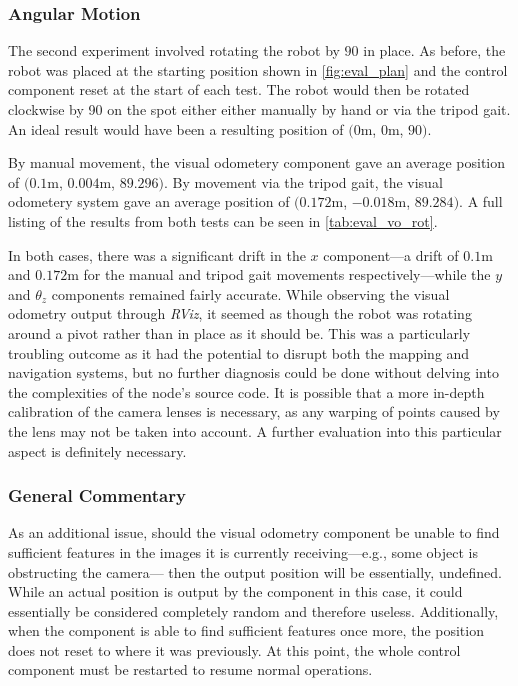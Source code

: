 \subsubsection{Angular Motion}

The second experiment involved rotating the robot by $90$\textdegree{} in place. As before, the robot was placed at the starting position shown in \autoref{fig:eval_plan} and the control component reset at the start of each test. The robot would then be rotated clockwise by 90\textdegree{} on the spot either either manually by hand or via the tripod gait. An ideal result would have been a resulting position of $(0$m, $0$m, $90$\textdegree{}$)$.

By manual movement, the visual odometery component gave an average position of $(0.1$m, $0.004$m, $89.296$\textdegree{}$)$. By movement via the tripod gait, the visual odometery system gave an average position of $(0.172$m, $-0.018$m, $89.284$\textdegree{}$)$. A full listing of the results from both tests can be seen in \autoref{tab:eval_vo_rot}.

In both cases, there was a significant drift in the $x$ component---a drift of $0.1$m and $0.172$m for the manual and tripod gait movements respectively---while the $y$ and $\theta_z$ components remained fairly accurate. While observing the visual odometry output through \emph{RViz}, it seemed as though the robot was rotating around a pivot rather than in place as it should be. This was a particularly troubling outcome as it had the potential to disrupt both the mapping and navigation systems, but no further diagnosis could be done without delving into the complexities of the node's source code. It is possible that a more in-depth calibration of the camera lenses is necessary, as any warping of points caused by the lens may not be taken into account. A further evaluation into this particular aspect is definitely necessary.

\subsubsection{General Commentary}

As an additional issue, should the visual odometry component be unable to find sufficient features in the images it is currently receiving---e.g., some object is obstructing the camera--- then the output position will be essentially, undefined. While an actual position is output by the component in this case, it could essentially be considered completely random and therefore useless. Additionally, when the component is able to find sufficient features once more, the position does not reset to where it was previously. At this point, the whole control component must be restarted to resume normal operations.

